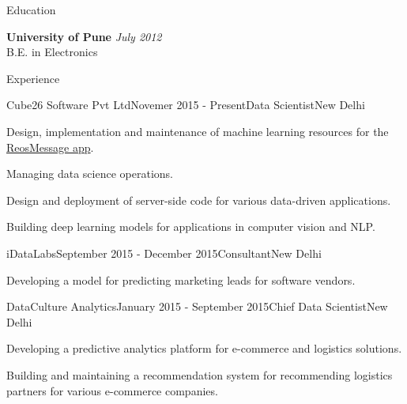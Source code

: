 \documentclass{resume} %
\begin{document}

\begin{rSection}{Education}

{\bf University of Pune} \hfill {\em July 2012} \\ 
B.E. in Electronics

\end{rSection}


\begin{rSection}{Experience}

\begin{rSubsection}{Cube26 Software Pvt Ltd}{Novemer 2015 - Present}{Data
    Scientist}{New Delhi}
\item Design, implementation and maintenance of machine learning resources for
    the \href{http://bit.ly/2bB0uGK}{ReosMessage app}.
\item Managing data science operations.
\item Design and deployment of server-side code for various data-driven
    applications.
\item Building deep learning models for applications in computer vision and
    NLP.
\end{rSubsection}

\begin{rSubsection}{iDataLabs}{September 2015 - December 2015}{Consultant}{New
    Delhi}
\item Developing a model for predicting marketing leads for software vendors.
\end{rSubsection}

\begin{rSubsection}{DataCulture Analytics}{January 2015 - September 2015}{Chief
    Data Scientist}{New Delhi}
\item Developing a predictive analytics platform for e-commerce and logistics
    solutions.
\item Building and maintaining a recommendation system for recommending
    logistics partners for various e-commerce companies.
\end{rSubsection}


\end{rSection}
\end{document}
